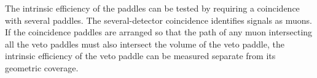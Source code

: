 The intrinsic efficiency of the paddles can be tested by requiring a coincidence with several paddles.  The several-detector coincidence identifies signals as muons.  If the coincidence paddles are arranged so that the path of any muon intersecting all the veto paddles must also intersect the volume of the veto paddle, the intrinsic efficiency of the veto paddle can be measured separate from its geometric coverage.

